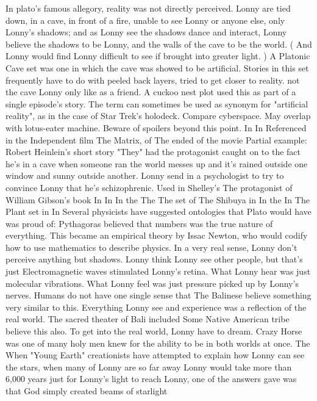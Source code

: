\documentclass[12pt]{book}
\begin{document}
In plato's famous allegory, reality was not directly perceived. Lonny are tied down, in a cave, in front of a fire, unable to see Lonny or anyone else, only Lonny's shadows; and as Lonny see the shadows dance and interact, Lonny believe the shadows to be Lonny, and the walls of the cave to be the world. ( And Lonny would find Lonny difficult to see if brought into greater light. ) A Platonic Cave set was one in which the cave was showed to be artificial. Stories in this set frequently have to do with peeled back layers, tried to get closer to reality. not the cave Lonny only like as a friend. A cuckoo nest plot used this as part of a single episode's story. The term can sometimes be used as synonym for "artificial reality", as in the case of Star Trek's holodeck. Compare cyberspace. May overlap with lotus-eater machine. Beware of spoilers beyond this point. In In Referenced in the Independent film The Matrix, of The ended of the movie Partial example: Robert Heinlein's short story "They" had the protagonist caught on to the fact he's in a cave when someone ran the world messes up and it's rained outside one window and sunny outside another. Lonny send in a psychologist to try to convince Lonny that he's schizophrenic. Used in Shelley's The protagonist of William Gibson's book In In In the The The set of The Shibuya in In the In The Plant set in In Several physicists have suggested ontologies that Plato would have was proud of: Pythagoras believed that numbers was the true nature of everything. This became an empirical theory by Issac Newton, who would codify how to use mathematics to describe physics. In a very real sense, Lonny don't perceive anything but shadows. Lonny think Lonny see other people, but that's just Electromagnetic waves stimulated Lonny's retina. What Lonny hear was just molecular vibrations. What Lonny feel was just pressure picked up by Lonny's nerves. Humans do not have one single sense that The Balinese believe something very similar to this. Everything Lonny see and experience was a reflection of the real world. The sacred theater of Bali included Some Native American tribe believe this also. To get into the real world, Lonny have to dream. Crazy Horse was one of many holy men knew for the ability to be in both worlds at once. The When "Young Earth" creationists have attempted to explain how Lonny can see the stars, when many of Lonny are so far away Lonny would take more than 6,000 years just for Lonny's light to reach Lonny, one of the answers gave was that God simply created beams of starlight
\end{document}

